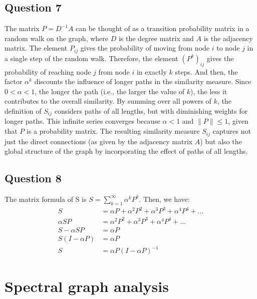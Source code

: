 \documentclass{article}
\begin{document}
\subsection{Question 7}
The matrix \( P = D^{-1}A \) can be thought of as a transition probability matrix in a random walk on the graph, where \( D \) is the degree matrix and \( A \) is the adjacency matrix. The element \( P_{ij} \) gives the probability of moving from node \( i \) to node \( j \) in a single step of the random walk.
Therefore, the element \( (P^k)_{ij} \) gives the probability of reaching node \( j \) from node \( i \) in exactly \( k \) steps.
And then, the factor \( \alpha^k \) discounts the influence of longer paths in the similarity measure. Since \( 0 < \alpha < 1 \), the longer the path (i.e., the larger the value of \( k \)), the less it contributes to the overall similarity.
By summing over all powers of \( k \), the definition of \( S_{ij} \) considers paths of all lengths, but with diminishing weights for longer paths. This infinite series converges because \( \alpha < 1 \) and \( \|P\| \leq 1 \), given that \( P \) is a probability matrix.
The resulting similarity measure \( S_{ij} \) captures not just the direct connections (as given by the adjacency matrix \( A \)) but also the global structure of the graph by incorporating the effect of paths of all lengths.

\subsection{Question 8}
The matrix formula of S is $S = \sum_{k=1}^{\infty} \alpha^k P^k$. Then, we have:
\begin{align*}
  S                & = \alpha P + \alpha^2 P^2 + \alpha^3 P^3 + \alpha^4 P^4 + \dots \\
  \alpha S P       & = \alpha^2 P^2 + \alpha^3 P^3 + \alpha^4 P^4 + \dots            \\
  S - \alpha S P   & = \alpha P                                                      \\
  S (I - \alpha P) & = \alpha P                                                      \\
  S                & = \alpha P (I - \alpha P)^{-1}
\end{align*}

\section{Spectral graph analysis}
\end{document}
